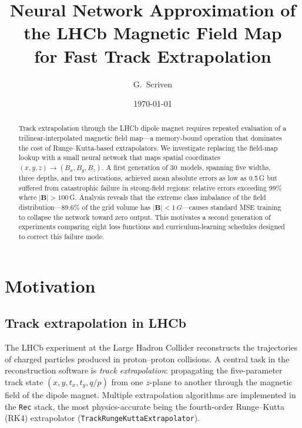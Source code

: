\documentclass[11pt,a4paper]{article}
\title{Neural Network Approximation of the LHCb Magnetic Field Map\\
       for Fast Track Extrapolation}
\author{G.\ Scriven}
\date{\today}
\newcommand{\SI}[2]{#1\,#2}
\begin{document}
\maketitle

\begin{abstract}
    Track extrapolation through the LHCb dipole magnet requires repeated
    evaluation of a trilinear-interpolated magnetic field map---a
    memory-bound operation that dominates the cost of Runge--Kutta-based
    extrapolators.  We investigate replacing the field-map lookup with a
    small neural network that maps spatial coordinates
    $(x,y,z) \to (B_x,B_y,B_z)$.  A first generation of 30~models,
    spanning five widths, three depths, and two activations, achieved
    mean absolute errors as low as 0.5\,G but suffered from
    catastrophic failure in strong-field regions: relative errors
    exceeding 99\% where
    $|\mathbf{B}| > 100$\,G.  Analysis reveals that the extreme
    class imbalance of the field distribution---89.6\% of the grid volume
    has $|\mathbf{B}| < \SI{1}{G}$---causes standard MSE training to
    collapse the network toward zero output.  This motivates a second
    generation of experiments comparing eight loss functions and
    curriculum-learning schedules designed to correct this failure mode.
\end{abstract}

\tableofcontents
\newpage

\section{Motivation}
\label{sec:motivation}

\subsection{Track extrapolation in LHCb}

The LHCb experiment at the Large Hadron Collider reconstructs the
trajectories of charged particles produced in proton--proton collisions.
A central task in the reconstruction software is \emph{track
extrapolation}: propagating the five-parameter track state
$(x, y, t_x, t_y, q/p)$ from one $z$-plane to another through the
magnetic field of the dipole magnet.  Multiple extrapolation algorithms
are implemented in the \texttt{Rec} stack, the most physics-accurate
being the fourth-order Runge--Kutta (RK4) extrapolator
(\texttt{TrackRungeKuttaExtrapolator}).
\end{document}
